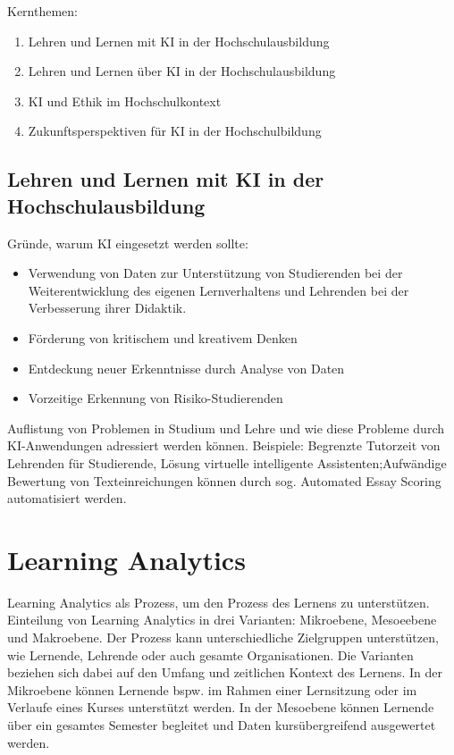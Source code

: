 Kernthemen:
\begin{enumerate}
    \item Lehren und Lernen mit KI in der Hochschulausbildung
    \item Lehren und Lernen über KI in der Hochschulausbildung
    \item KI und Ethik im Hochschulkontext
    \item Zukunftsperspektiven für KI in der Hochschulbildung
\end{enumerate}


\subsection{Lehren und Lernen mit KI in der Hochschulausbildung}

Gründe, warum KI eingesetzt werden sollte:
\begin{itemize}
    \item Verwendung von Daten zur Unterstützung von Studierenden bei der Weiterentwicklung des eigenen Lernverhaltens und Lehrenden bei der Verbesserung ihrer Didaktik.
    \item Förderung von kritischem und kreativem Denken
    \item Entdeckung neuer Erkenntnisse durch Analyse von Daten
    \item Vorzeitige Erkennung von Risiko-Studierenden
\end{itemize}

Auflistung von Problemen in Studium und Lehre und wie diese Probleme durch KI-Anwendungen adressiert werden können. Beispiele: Begrenzte Tutorzeit von Lehrenden für Studierende, Lösung virtuelle intelligente Assistenten;Aufwändige Bewertung von Texteinreichungen können durch sog. Automated Essay Scoring automatisiert werden.

\section*{Learning Analytics}
Learning Analytics als Prozess, um den Prozess des Lernens zu unterstützen. Einteilung von Learning Analytics in drei Varianten: Mikroebene, Mesoeebene und Makroebene. Der Prozess kann unterschiedliche Zielgruppen unterstützen, wie Lernende, Lehrende oder auch gesamte Organisationen. Die Varianten beziehen sich dabei auf den Umfang und zeitlichen Kontext des Lernens. In der Mikroebene können Lernende bspw. im Rahmen einer Lernsitzung oder im Verlaufe eines Kurses unterstützt werden. In der Mesoebene können Lernende über ein gesamtes Semester begleitet und Daten kursübergreifend ausgewertet werden.


